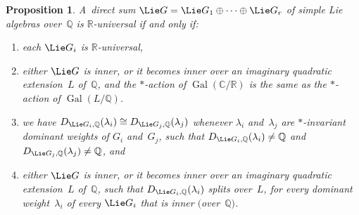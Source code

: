 \documentclass[pdftex]{sigma}
\DeclareMathOperator{\Gal}{Gal}
\numberwithin{equation}{section}
\newtheorem{prop}{Proposition}[section]
\begin{document}
\begin{prop}
A~direct sum $\Lie G = \Lie G_1 \oplus \dots \oplus \Lie G_r$ of simple Lie algebras over~$\mathbb{Q}$ is
$\mathbb{R}$-universal if and only if:
\renewcommand{\labelenumi}{{\rm (\theenumi)}}
\begin{enumerate}\itemsep=0pt
\item
\label{SS-Gi}
each $\Lie G_i$ is $\mathbb{R}$-universal,
\item
\label{SS-star}
either $\Lie G$ is inner, or it becomes inner over an imaginary quadratic extension~$L$ of~$\mathbb{Q}$, and the
$*$-action of $\Gal(\mathbb{C}/\mathbb{R})$ is the same as the $*$-action of $\Gal(L/\mathbb{Q})$.
\item
\label{SS-Di=Dj}
we have $D_{\Lie G_i, \mathbb{Q}}(\lambda_i) \cong D_{\Lie G_j, \mathbb{Q}}(\lambda_j)$ whenever $\lambda_i$
and~$\lambda_j$ are $*$-invariant dominant weights of $G_i$ and~$G_j$, such that $D_{\Lie G_i, \mathbb{Q}}(\lambda_i)
\neq \mathbb{Q}$ and $D_{\Lie G_j, \mathbb{Q}}(\lambda_j) \neq \mathbb{Q}$, and
\item
\label{SS-Dsplit}
either $\Lie G$ is inner, or it becomes inner over an imaginary quadratic extension~$L$ of~$\mathbb{Q}$, such that
$D_{\Lie G_i, \mathbb{Q}}(\lambda_i)$ splits over~$L$, for every dominant weight~$\lambda_i$ of every $\Lie G_i$ that is
inner $($over~$\mathbb{Q})$.
\end{enumerate}
\end{prop}
\end{document}
